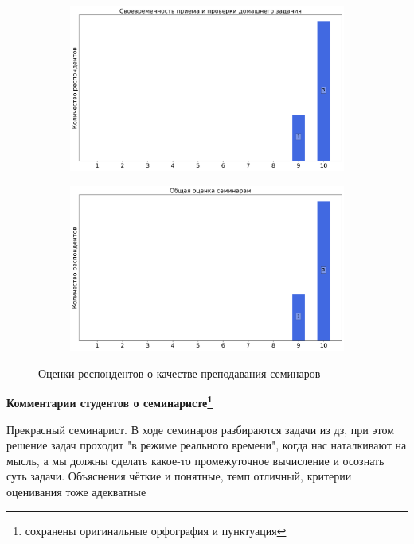 \begin{figure}[H]
\begin{subfigure}[b]{0.45\textwidth}
                \includegraphics[width=\textwidth]{images/3 course/Теория поля/seminarists-marks-Дудченко В.А.-2.png}
            \end{subfigure}
            \begin{subfigure}[b]{0.45\textwidth}
                \centering
                \includegraphics[width=\textwidth]{images/3 course/Теория поля/seminarists-marks-Дудченко В.А.-3.png}
            \end{subfigure}	
            \caption{Оценки респондентов о качестве преподавания семинаров}
        \end{figure}

        \textbf{Комментарии студентов о семинаристе\protect\footnote{сохранены оригинальные орфография и пунктуация}}
            \begin{commentbox} 
                Прекрасный семинарист. В ходе семинаров разбираются задачи из дз, при этом решение задач проходит "в режиме реального времени", когда нас наталкивают на мысль, а мы должны сделать какое-то промежуточное вычисление и осознать суть задачи. Объяснения чёткие и понятные, темп отличный, критерии оценивания тоже адекватные  
            \end{commentbox} 
        
